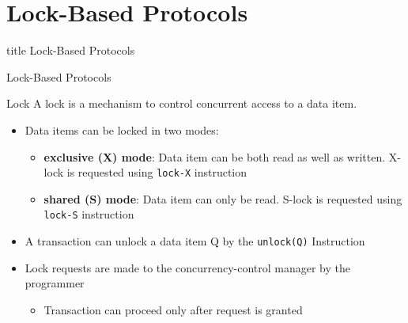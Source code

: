 \documentclass[aspectratio=169, xcolor=dvipsnames]{beamer}
\begin{document}
\section{Lock-Based Protocols}

\begin{frame}
  \vfill
  \centering
  \begin{beamercolorbox}[sep=8pt,center,shadow=true,rounded=true]{title}
    Lock-Based Protocols\par%
  \end{beamercolorbox}
  \vfill
\end{frame}

\begin{frame}{Lock-Based Protocols}
    \begin{block}{Lock}
        A lock is a mechanism to control concurrent access to a data item.
    \end{block}
    \begin{itemize}[<+->]
        \item Data items can be locked in two modes:
        \begin{itemize}
            \item[$\triangleright$] \textbf{exclusive (X) mode}: Data item can be both read as well as written. X-lock is requested using \texttt{lock-X} instruction
            \item[$\triangleright$] \textbf{shared (S) mode}: Data item can only be read. S-lock is requested using \texttt{lock-S} instruction
        \end{itemize}
        \item A transaction can unlock a data item Q by the \texttt{unlock(Q)} Instruction
        \item Lock requests are made to the concurrency-control manager by the programmer
        \begin{itemize}
            \item[$\triangleright$] Transaction can proceed only after request is granted
        \end{itemize}
    \end{itemize}
\end{frame}
\end{document}
